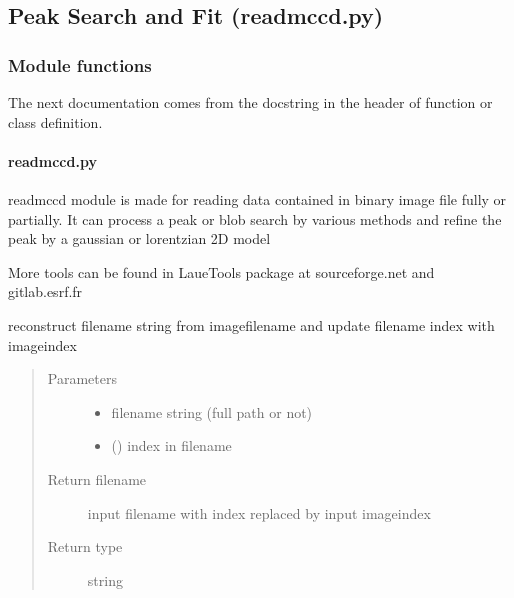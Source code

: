 \documentclass[letterpaper,10pt,english]{sphinxmanual}
\begin{document}
\subsection{Peak Search and Fit (readmccd.py)}
\label{\detokenize{PeakSearch::doc}}\label{\detokenize{PeakSearch:peak-search-and-fit-readmccd-py}}

\subsubsection{Module functions}
\label{\detokenize{PeakSearch:module-functions}}
The next documentation comes from the docstring in the header of function or class definition.


\paragraph{readmccd.py}
\label{\detokenize{PeakSearch:readmccd-py}}\label{\detokenize{PeakSearch:module-LaueTools.readmccd}}
readmccd module is made for reading data contained in binary image file
fully or partially.
It can process a peak or blob search by various methods
and refine the peak by a gaussian or lorentzian 2D model

More tools can be found in LaueTools package at sourceforge.net and gitlab.esrf.fr

\begin{fulllineitems}
\label{\detokenize{PeakSearch:LaueTools.readmccd.setfilename}}
reconstruct filename string from imagefilename and update filename index with imageindex
\begin{quote}\begin{description}
\item[{Parameters}] \leavevmode\begin{itemize}
\item {} 
 \textendash{} filename string (full path or not)

\item {} 
 () \textendash{} index in filename

\end{itemize}

\item[{Return filename}] \leavevmode
input filename with index replaced by input imageindex

\item[{Return type}] \leavevmode
string

\end{description}\end{quote}

\end{fulllineitems}
\end{document}
